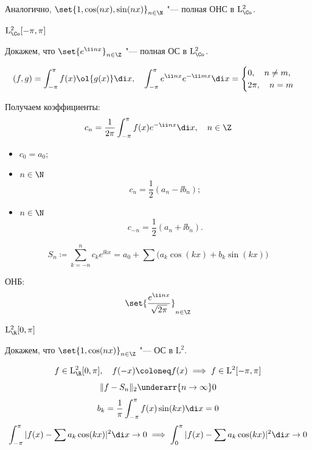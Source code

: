 \begin{exmpls}
	Аналогично, $ \set{1, \cos(nx), \sin(nx)}_{n \in \N} $ "--- полная ОНС в $ \mathrm L_\Co^2 $.
\item $ \mathrm L_\Co^2 [-\pi, \pi] $

	Докажем, что $ \set{e^{\ii nx}}_{n \in \Z} $ "--- полная ОС в $ \mathrm L_\Co^2 $.

	$$ (f, g) = \int_{-\pi}^\pi f(x) \ol{g(x)} \di x, \quad
	\int_{-\pi}^\pi e^{\ii nx}e^{-\ii mx} \di x =
	\begin{cases}
		0, \quad n \ne m, \\
		2\pi, \quad n = m
	\end{cases} $$

	Получаем коэффициенты:
	$$ c_n = \frac1{2\pi} \int_{-\pi}^\pi f(x) e^{-\ii nx}\di x, \quad n \in \Z $$

	\begin{itemize}
		\item $ c_0 = a_0 $;
		\item $ n \in \N $
			$$ c_n = \frac12(a_n - \ii b_n); $$
		\item $ n \in \N $
			$$ c_{-n} = \frac12(a_n + \ii b_n). $$
	\end{itemize}

	$$ S_n \coloneq \sum_{k = -n}^n c_ke^{\ii kx} =
	a_0 + \sum \bigl( a_k \cos(kx) + b_k \sin(kx) \bigr) $$

	ОНБ:
	$$ \set{\frac{e^{\ii nx}}{\sqrt{2\pi}}}_{n \in \Z} $$
\item $ \mathrm L_\R^2[0, \pi] $

	Докажем, что $ \set{1, \cos(nx)}_{n \in \Z} $ "--- ОС в $ \mathrm L^2 $.

	$$ f \in \mathrm L_\R^2[0, \pi], \quad f(-x) \coloneq f(x) \implies
	f \in \mathrm L^2[-\pi, \pi] $$
	$$ \|f - S_n\|_2 \underarr{n \to \infty} 0 $$
	$$ b_k = \frac1\pi \int_{-\pi}^\pi f(x) \sin(kx) \di x = 0 $$
	$$ \int_{-\pi}^\pi |f(x) - \sum a_k \cos(kx)|^2 \di x \to 0 \implies
	\int_0^\pi |f(x) - \sum a_k\cos(kx)|^2 \di x \to 0 $$
\end{exmpls}
